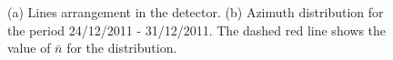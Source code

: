 \documentclass[a4paper]{jpconf}
\begin{document}
\begin{figure}[!h]
\centering
{} \quad
{}
\caption{(a) Lines arrangement in the detector. (b) Azimuth distribution for the period 24/12/2011 - 31/12/2011. The dashed red line shows the value of $\bar{n}$ for the distribution.    }
\label{fig:azi}
\end{figure}
\end{document}

